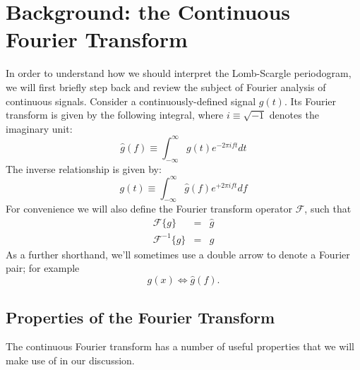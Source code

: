 \documentclass[preprint]{aastex}
\newcommand{\eqlabel}[1]{\label{eq:#1}}
\newcommand{\sectlabel}[1]{\label{sect:#1}}
\begin{document}
\section{Background: the Continuous Fourier Transform}
\sectlabel{continuous-fourier-transform}

In order to understand how we should interpret the Lomb-Scargle periodogram, we will first briefly step back and review the subject of Fourier analysis of continuous signals.
Consider a continuously-defined signal $g(t)$.
Its Fourier transform is given by the following integral, where $i\equiv\sqrt{-1}$ denotes the imaginary unit:
\begin{equation}
    \hat{g}(f) \equiv \int_{-\infty}^\infty g(t) e^{-2\pi i f t} dt
    \eqlabel{FT-def}
\end{equation}
The inverse relationship is given by:
\begin{equation}
    g(t) \equiv \int_{-\infty}^\infty \hat{g}(f) e^{+2\pi i f t} df
    \eqlabel{IFT-def}
\end{equation}
For convenience we will also define the Fourier transform operator
$\mathcal{F}$, such that
\begin{eqnarray}
    \mathcal{F}\{g\} &=& \hat{g} \\
    \mathcal{F}^{-1}\{\hat{g}\} &=& g
\end{eqnarray}
As a further shorthand, we'll sometimes use a double arrow to denote a Fourier
pair; for example
\begin{equation}
  g(x) \Longleftrightarrow \hat{g}(f).
\end{equation}

\subsection{Properties of the Fourier Transform}

The continuous Fourier transform has a number of useful properties that we will make use of in our discussion.
\end{document}
